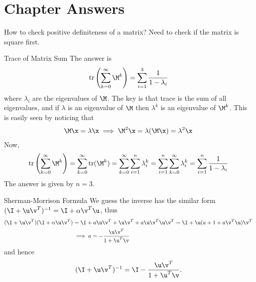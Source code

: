 \documentclass[oldfontcommands]{memoir}
\begin{document}
{\newpage\section{Chapter Answers}\begin{answer}{How to check positive definiteness of a matrix?}
Need to check if the matrix is square first.\end{answer}
\begin{answer}{Trace of Matrix Sum}
	The answer is
	\begin{align*}
	\mbox{tr}\left(\sum_{k=0}^\infty \M^k\right) = \sum_{i=1}^3 \frac{1}{1 - \lambda_i}
	\end{align*}
	where $\lambda_i$ are the eigenvalues of $\M$. The key is that trace is the sum of all eigenvalues, and if $\lambda$ is an eigenvalue of $\M$ then $\lambda^k$ is an eigenvalue of $\M^k$. This is easily seen by noticing that
	\begin{align*}
		\M\x = \lambda\x \implies \M^2\x = \lambda(\M\x) = \lambda^2 \x
	\end{align*}
	Now, 
	\begin{align*}
	\mbox{tr}\left(\sum_{k=0}^\infty \M^k\right) = \sum_{k=0}^\infty \mbox{tr}(\M^k) = \sum_{k=0}^\infty \sum_{i=1}^n \lambda_i^k = \sum_{i=1}^n \sum_{k=0}^\infty \lambda_i^k = \sum_{i=1}^n \frac{1}{1 - \lambda_i}
	\end{align*}
	The answer is given by $n = 3$.
\end{answer}
\begin{answer}{Sherman-Morrison Formula}
We guess the inverse has the similar form $(\I + \u\v^T)^{-1} = \I + \alpha\v^T\u$, thus
\begin{align*}
(\I + \u\v^T)(\I + \alpha\u\v^T) &= \I + a\u\v^T + \u\v^T + a\u\v^T\u\v^T = \I + \u(a+1+a\v^T\u)\v^T \\
&\implies a = -\frac{\u\v^T}{1+\u^T\v}
\end{align*}
and hence $$(\I + \u\v^T)^{-1} = \I - \frac{\u\v^T}{1 + \u^T\v}.$$	


\end{answer}}
\end{document}
